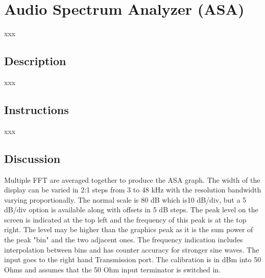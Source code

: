\section{Audio Spectrum Analyzer (ASA)}
xxx
\subsection{Description}
xxx
\subsection{Instructions}
xxx
\subsection{Discussion}
Multiple FFT are averaged together to produce the ASA graph.  The width of the display can be varied in 2:1 steps from 3 to 48 kHz with the resolution bandwidth varying proportionally.  The normal scale is 80 dB which is10 dB/div, but a 5 dB/div option is available along with offsets in 5 dB steps.  The peak level on the screen is indicated at the top left and the frequency of this peak is at the top right.  The level may be higher than the graphics peak as it is the sum power of the peak "bin" and the two adjacent ones.  The frequency indication includes interpolation between bins and has counter accuracy for stronger sine waves.  The input goes to the right hand Transmission port.  The calibration is in dBm into 50 Ohms and assumes that the 50 Ohm input terminator is switched in.

